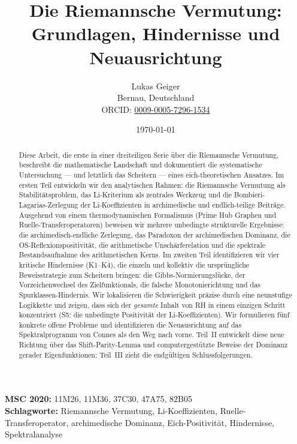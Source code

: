 \documentclass[12pt,a4paper]{article}
\title{Die Riemannsche Vermutung:\\
Grundlagen, Hindernisse und Neuausrichtung}
\author{Lukas Geiger\\
\small Bernau, Deutschland\\
\small ORCID: \href{https://orcid.org/0009-0005-7296-1534}{0009-0005-7296-1534}}
\date{\today}
\theoremstyle{definition}
\theoremstyle{remark}
\begin{document}
\maketitle

\begin{abstract}
Diese Arbeit, die erste in einer dreiteiligen Serie über die Riemannsche Vermutung, beschreibt die mathematische Landschaft und dokumentiert die systematische Untersuchung --- und letztlich das Scheitern --- eines eich-theoretischen Ansatzes. Im ersten Teil entwickeln wir den analytischen Rahmen: die Riemannsche Vermutung als Stabilitätsproblem, das Li-Kriterium als zentrales Werkzeug und die Bombieri-Lagarias-Zerlegung der Li-Koeffizienten in archimedische und endlich-teilige Beiträge. Ausgehend von einem thermodynamischen Formalismus (Prime Hub Graphen und Ruelle-Transferoperatoren) beweisen wir mehrere unbedingte strukturelle Ergebnisse: die archimedisch-endliche Zerlegung, das Paradoxon der archimedischen Dominanz, die OS-Reflexionspositivität, die arithmetische Unschärferelation und die spektrale Bestandsaufnahme des arithmetischen Kerns. Im zweiten Teil identifizieren wir vier kritische Hindernisse (K1--K4), die einzeln und kollektiv die ursprüngliche Beweisstrategie zum Scheitern bringen: die Gibbs-Normierungslücke, der Vorzeichenwechsel des Zielfunktionals, die falsche Monotonierichtung und das Spurklassen-Hindernis. Wir lokalisieren die Schwierigkeit präzise durch eine neunstufige Logikkette und zeigen, dass sich der \emph{gesamte} Inhalt von RH in einem einzigen Schritt konzentriert (S5: die unbedingte Positivität der Li-Koeffizienten). Wir formulieren fünf konkrete offene Probleme und identifizieren die Neuausrichtung auf das Spektralprogramm von Connes als den Weg nach vorne. Teil~II entwickelt diese neue Richtung über das Shift-Parity-Lemma und computergestützte Beweise der Dominanz gerader Eigenfunktionen; Teil~III zieht die endgültigen Schlussfolgerungen.
\end{abstract}

\noindent\textbf{MSC 2020:} 11M26, 11M36, 37C30, 47A75, 82B05\\
\textbf{Schlagworte:} Riemannsche Vermutung, Li-Koeffizienten, Ruelle-Transferoperator, archimedische Dominanz, Eich-Positivität, Hindernisse, Spektralanalyse

\newpage
\tableofcontents


\end{document}
